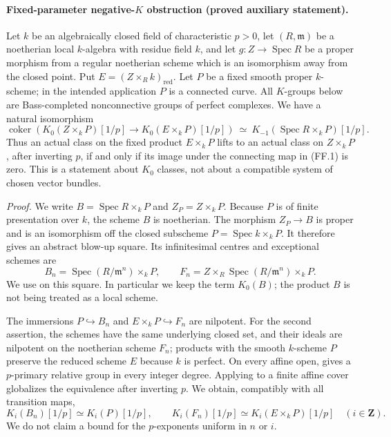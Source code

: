 \paragraph{Fixed-parameter negative-$K$ obstruction (proved auxiliary statement).}
Let $k$ be an algebraically closed field of characteristic $p>0$, let
$(R,\mathfrak m)$ be a noetherian local $k$-algebra with residue field $k$,
and let $g:Z\to\operatorname{Spec}R$ be a proper morphism from a regular
noetherian scheme which is an isomorphism away from the closed point.
Put $E=(Z\times_R k)_{\mathrm{red}}$.  Let $P$ be a fixed smooth proper
$k$-scheme; in the intended application $P$ is a connected curve.  All
$K$-groups below are Bass-completed nonconnective groups of perfect
complexes.  We have a natural isomorphism
\begin{equation}
 \operatorname{coker}\!\left(
 K_0(Z\times_k P)[1/p]\longrightarrow K_0(E\times_k P)[1/p]
 \right)
 \ \simeq\ K_{-1}(\operatorname{Spec}R\times_k P)[1/p].
 \tag{FF.1}
\end{equation}
Thus an actual class on the fixed product $E\times_k P$ lifts to an actual
class on $Z\times_k P$, after inverting $p$, if and only if its image
under the connecting map in (FF.1) is zero.  This is a statement about
$K_0$ classes, not about a compatible system of chosen vector bundles.

\emph{Proof.}
We write $B=\operatorname{Spec}R\times_k P$ and $Z_P=Z\times_k P$.
Because $P$ is of finite presentation over $k$, the scheme $B$ is
noetherian.  The morphism $Z_P\to B$ is proper and is an isomorphism
off the closed subscheme $P=\operatorname{Spec}k\times_k P$.
It therefore gives an abstract blow-up square.  Its infinitesimal
centres and exceptional schemes are
\[
 B_n=\operatorname{Spec}(R/\mathfrak m^n)\times_k P,
 \qquad
 F_n=Z\times_R\operatorname{Spec}(R/\mathfrak m^n)\times_k P.
\]
We use \citet[Theorem A and (1.6), author pp.~2--3]
{rootKerzStrunkTamme2018} on this square.  In particular we keep the term
$K_0(B)$; the product $B$ is not being treated as a local scheme.

The immersions $P\hookrightarrow B_n$ and $E\times_kP\hookrightarrow F_n$
are nilpotent.  For the second assertion, the schemes have the same
underlying closed set, and their ideals are nilpotent on the noetherian
scheme $F_n$; products with the smooth $k$-scheme $P$ preserve the
reduced scheme $E$ because $k$ is perfect.  On every affine open,
\citet[Theorem A, p.~29]{rootGeisserHesselholt2011} gives a
$p$-primary relative group in every integer degree.  Applying
\citet[Theorem 8.1, p.~367]{D_ThomasonTrobaugh1990} to a finite affine
cover globalizes the equivalence after inverting $p$.  We obtain,
compatibly with all transition maps,
\begin{equation}
 K_i(B_n)[1/p]\simeq K_i(P)[1/p],\qquad
 K_i(F_n)[1/p]\simeq K_i(E\times_kP)[1/p]
 \quad(i\in\mathbf Z).
 \tag{FF.2}
\end{equation}
We do not claim a bound for the $p$-exponents uniform in $n$ or $i$.

